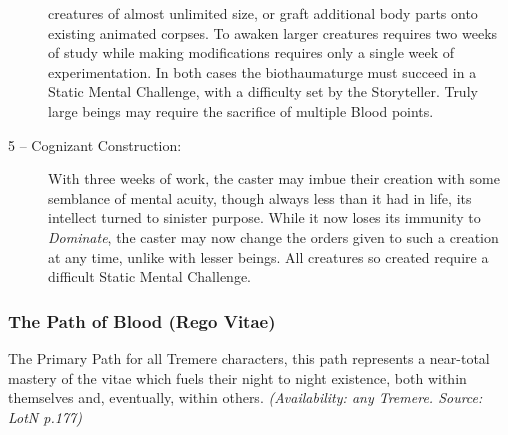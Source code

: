 \begin{description}
	creatures of almost unlimited size, or graft additional body parts onto existing animated corpses.  
	To awaken larger creatures requires two weeks of study while making modifications requires only a 
	single week of experimentation.  In both cases the biothaumaturge must succeed in a Static Mental 
	Challenge, with a difficulty set by the Storyteller.  Truly large beings may require the sacrifice 
	of multiple Blood points.
	\item[5 -- Cognizant Construction:]  With three weeks of work, the caster may imbue their creation 
	with some semblance of mental acuity, though always less than it had in life, its intellect turned 
	to sinister purpose.  While it now loses its immunity to \emph{Dominate}, the caster may now change 
	the orders given to such a creation at any time, unlike with lesser beings.  All creatures so 
	created require a difficult Static Mental Challenge.
\end{description}

\subsubsection{The Path of Blood (Rego Vitae)}
The Primary Path for all Tremere characters, this path represents a near-total mastery of the 
vitae which fuels their night to night existence, both within themselves and, eventually, within 
others.  \emph{(Availability: any Tremere.  Source: LotN p.177)}

